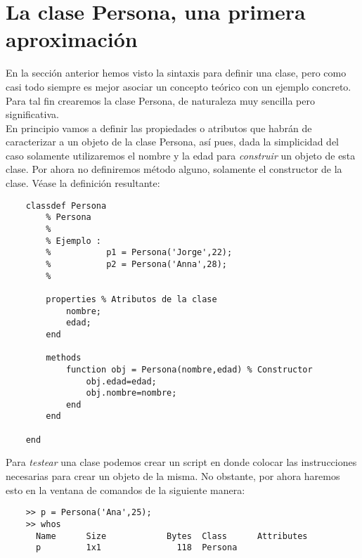 \section{La clase Persona, una primera aproximación}

En la sección anterior hemos visto la sintaxis para definir una clase, pero como casi 
todo siempre es mejor asociar un concepto teórico con un ejemplo concreto. Para tal fin 
crearemos la clase Persona, de naturaleza muy sencilla pero significativa.\\

En principio vamos a definir las propiedades o atributos que habrán de caracterizar a un 
objeto de la clase Persona, así pues, dada la simplicidad del caso solamente utilizaremos 
el nombre y la edad para \textit{construir} un objeto de esta clase. Por ahora no definiremos 
método alguno, solamente el constructor de la clase. Véase la definición resultante:

\begin{verbatim}
	classdef Persona
	    % Persona
	    %
	    % Ejemplo :
	    %           p1 = Persona('Jorge',22);
	    %           p2 = Persona('Anna',28);          
	    %
	    
	    properties % Atributos de la clase
	        nombre;
	        edad;
	    end
	    
	    methods
	        function obj = Persona(nombre,edad) % Constructor
	            obj.edad=edad;
	            obj.nombre=nombre;
	        end
	    end
	    
	end
\end{verbatim}

Para \textit{testear} una clase podemos crear un script en donde colocar las instrucciones 
necesarias para crear un objeto de la misma. No obstante, por ahora haremos esto en 
la ventana de comandos de la siguiente manera:

\begin{verbatim}
	>> p = Persona('Ana',25);
	>> whos
	  Name      Size            Bytes  Class      Attributes
	  p         1x1               118  Persona        
\end{verbatim}
